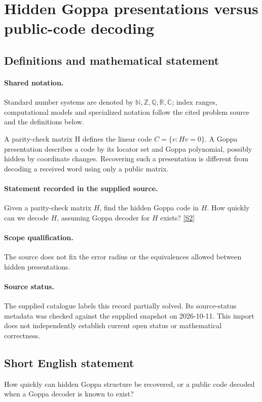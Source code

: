 \documentclass[11pt]{article}
\newcommand{\sref}[2]{\hyperlink{source:#1:#2}{[S#2]}}
\begin{document}
\section{Hidden Goppa presentations versus public-code decoding}\label{statement}

\subsection{Definitions and mathematical statement}

\paragraph{Shared notation.}Standard number systems are denoted by $\mathbb N,\mathbb Z,\mathbb Q,\mathbb R,\mathbb C$; index ranges, computational models and specialized notation follow the cited problem source and the definitions below.


A parity-check matrix H defines the linear code $C=\{v:Hv=0\}$. A Goppa presentation describes a code by its locator set and Goppa polynomial, possibly hidden by coordinate changes. Recovering such a presentation is different from decoding a received word using only a public matrix.
\paragraph{Statement recorded in the supplied source.}
Given a parity-check matrix $H$, find the hidden Goppa code in $H$. How quickly can we decode $H$, assuming Goppa decoder for $H$ exists? \sref{statement}{2}
\paragraph{Scope qualification.}
The source does not fix the error radius or the equivalences allowed between hidden presentations.
\paragraph{Source status.}
The supplied catalogue labels this record partially solved. Its source-status metadata was checked against the supplied snapshot on 2026-10-11. This import does not independently establish current open status or mathematical correctness.
\subsection{Short English statement}
How quickly can hidden Goppa structure be recovered, or a public code decoded when a Goppa decoder is known to exist?
\end{document}
